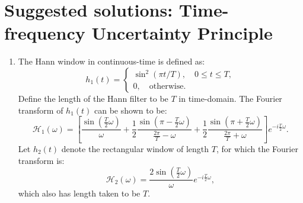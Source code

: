 \newpage
\section{Suggested solutions: Time-frequency Uncertainty Principle}

\begin{enumerate}
\item The Hann window in continuous-time is defined as:
$$h_{1}(t)=\begin{cases}
    \sin^{2}(\pi t/T), \quad 0\le t\le T, \\
    0, \quad \text{otherwise}.
\end{cases}$$
Define the length of the Hann filter to be $T$ in time-domain. The Fourier transform of $h_{1}(t)$ can be shown to be:
$$\mathcal{H}_{1}(\omega)=\left[\frac{\sin(\frac{T}{2}\omega)}{\omega}+\frac{1}{2}\frac{\sin(\pi-\frac{T}{2}\omega)}{\frac{2\pi}{T}-\omega}+\frac{1}{2}\frac{\sin(\pi+\frac{T}{2}\omega)}{\frac{2\pi}{T}+\omega}\right]e^{-i\frac{T}{2}\omega}.$$
Let $h_{2}(t)$ denote the rectangular window of length $T$, for which the Fourier transform is:
$$\mathcal{H}_{2}(\omega)=\frac{2\sin(\frac{T}{2}\omega)}{\omega}e^{-i\frac{T}{2}\omega},$$
which also has length taken to be $T$. 


\end{enumerate}
